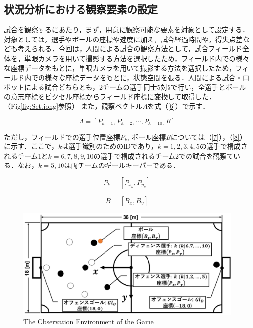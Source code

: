 \clearpage%


\subsection{状況分析における観察要素の設定}
試合を観察するにあたり，まず，用意に観察可能な要素を対象として設定する．対象としては，選手やボールの座標や速度に加え，試合経過時間や，得失点差なども考えられる．今回は，人間による試合の観察方法として，試合フィールド全体を，単眼カメラを用いて撮影する方法を選択したため，フィールド内での様々な座標データをもとに，単眼カメラを用いて撮影する方法を選択したため，フィールド内での様々な座標データをもとに，状態空間を張る．人間による試合・ロボットによる試合どちらとも，2チームの選手同士5対5で行い，全選手とボールの意志座標をピクセル座標からフィールド座標に変換して取得した．（Fig\ref{fig:Settiong}参照）
また，観察ベクトル$A$を式（\ref{6}）で示す．

\begin{equation}
\label{6}
A = [P_{k=1}, P_{k=2}, \cdots, P_{k=10}, B]
\end{equation}

ただし，フィールドでの選手位置座標$P_k$, ボール座標$B$については（\ref{7}），（\ref{8}）に示す．ここで，$k$は選手識別のためのIDであり，$k=1,2,3,4,5$の選手で構成されるチーム1と$k = 6,7,8,9,10$の選手で構成されるチーム2での試合を観察ている．なお，$k = 5,10$は両チームのギールキーパーである．

\begin{equation}
\label{7}
P_k = [P_{x_k}, P_{y_k}]
\end{equation}

\begin{equation}
\label{8}
B = [B_{x}, B_{y}]
\end{equation}

\clearpage %

\begin{figure}[ht]
  \begin{center}
  
    \includegraphics[clip,width=15.0cm]{figure/The_Observation_Environment_of_the_Game.eps}
    \caption{The Observation Environment of the Game}
    \label{fig:Setting}
    
  \end{center}
\end{figure}

